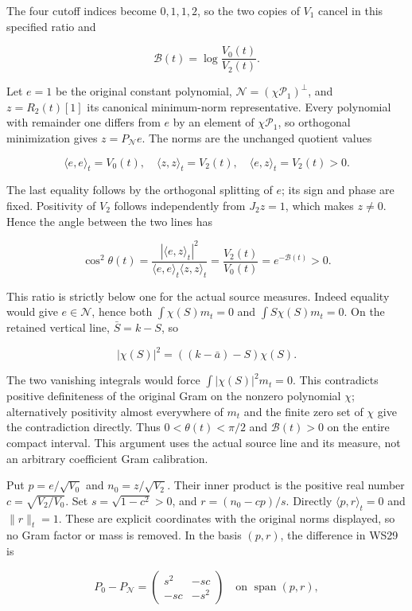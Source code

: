 The four cutoff indices become \(0,1,1,2\), so the two copies of \(V_1\) cancel in this specified ratio and

\[
\mathcal B(t)=\log\frac{V_0(t)}{V_2(t)}.
\tag{WS30}
\]

Let \(e=1\) be the original constant polynomial, \(\mathcal N=(\chi\mathcal P_1)^\perp\), and \(z=R_2(t)[1]\) its canonical minimum-norm representative. Every polynomial with remainder one differs from \(e\) by an element of \(\chi\mathcal P_1\), so orthogonal minimization gives \(z=P_{\mathcal N}e\). The norms are the unchanged quotient values

\[
\langle e,e\rangle_t=V_0(t),\quad
\langle z,z\rangle_t=V_2(t),\quad
\langle e,z\rangle_t=V_2(t)>0.
\tag{WS31}
\]

The last equality follows by the orthogonal splitting of \(e\); its sign and phase are fixed. Positivity of \(V_2\) follows independently from \(J_2z=1\), which makes \(z\ne0\). Hence the angle between the two lines has

\[
\cos^2\theta(t)
=\frac{|\langle e,z\rangle_t|^2}
        {\langle e,e\rangle_t\langle z,z\rangle_t}
=\frac{V_2(t)}{V_0(t)}=e^{-\mathcal B(t)}>0.
\tag{WS32}
\]

This ratio is strictly below one for the actual source measures. Indeed equality would give \(e\in\mathcal N\), hence both \(\int\chi(S)m_t=0\) and \(\int S\chi(S)m_t=0\). On the retained vertical line, \(\bar S=k-S\), so

\[
|\chi(S)|^2=((k-\bar a)-S)\chi(S).
\tag{WS33}
\]

The two vanishing integrals would force \(\int|\chi(S)|^2m_t=0\). This contradicts positive definiteness of the original Gram on the nonzero polynomial \(\chi\); alternatively positivity almost everywhere of \(m_t\) and the finite zero set of \(\chi\) give the contradiction directly. Thus \(0<\theta(t)<\pi/2\) and \(\mathcal B(t)>0\) on the entire compact interval. This argument uses the actual source line and its measure, not an arbitrary coefficient Gram calibration.

Put \(p=e/\sqrt{V_0}\) and \(n_0=z/\sqrt{V_2}\). Their inner product is the positive real number \(c=\sqrt{V_2/V_0}\). Set \(s=\sqrt{1-c^2}>0\), and \(r=(n_0-cp)/s\). Directly \(\langle p,r\rangle_t=0\) and \(\|r\|_t=1\). These are explicit coordinates with the original norms displayed, so no Gram factor or mass is removed. In the basis \((p,r)\), the difference in WS29 is

\[
P_0-P_{\mathcal N}
=\begin{pmatrix}s^2&-sc\\-sc&-s^2\end{pmatrix}
\quad\text{on }\operatorname{span}(p,r),
\tag{WS34}
\]

